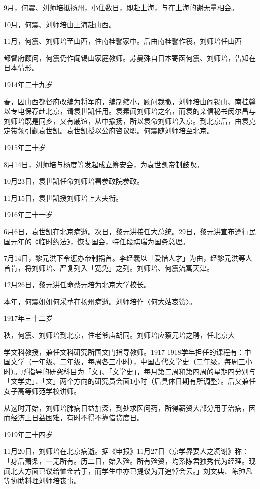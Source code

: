 9月，何震、刘师培抵扬州，小住数日，即赴上海，与在上海的谢无量相会。

10月，何震、刘师培由上海赴山西。

11月，何震、刘师培至山西，住南桂馨家中。后由南桂馨作筏，刘师培任山西


\noindent 都督府顾问，何震仍作阎锡山家庭教师。苏曼殊自日本寄函何震、刘师培，告知在日本情形。

1914年二十九岁

春，因山西都督府改编为将军府，编制缩小，顾问裁撤，刘师培由阎锡山、南桂馨以专电保荐赴北京，请袁世凯任用。袁素闻刘师培之名，而袁的亲信秘书闵尔昌与刘师培既是同乡，又有戚谊，从中揄扬，所以袁命刘师培入京。到北京后，由袁克定带领引觐袁世凯。袁世凯授以公府咨议职。何震随刘师培至北京。

1915年三十岁

8月14日，刘师培与杨度等发起成立筹安会，为袁世凯帝制鼓吹。

10月23日，袁世凯任命刘师培署参政院参政。

11月15日，袁世凯授刘师培上大夫衔。

1916年三十一岁

6月6日，袁世凯在北京病逝。次日，黎元洪接任大总统。29日，黎元洪宣布遵行民国元年的《临时约法》，恢复国会，特任段祺瑞为国务总理。

7月14日，黎元洪下令惩办帝制祸首。李经羲以「爱惜人才」为由，经黎元洪等人首肯，将刘师培、严复列入「宽免」之列。刘师培、何震流寓天津。

12月26日，黎元洪任命蔡元培为北京大学校长。

本年，何震姐姐何采苹在扬州病逝。刘师培作〈何大姑哀赞〉。

1917年三十二岁

秋，何震、刘师培到北京，住老爷庙胡同。刘师培应蔡元培之聘，任北京大


\noindent 学文科教授，兼任文科研究所国文门指导教师。1917-1918学年担任的课程有：中国文学（一年级、二年级，每周各三小时），中国古代文学史（二年级，每周三小时）。所指导的研究科目为「文」、「文学史」，每月第二周和第四周的星期四分别与「文学史」、「文」两个方向的研究员会面1小时（后具体日期有所调整）。后又兼任女子高等师范学校讲师。

从这时开始，刘师培肺病日益加深，到处求医问药，所得薪资大部分用于治病，因而经济上日益困难，有时不得不靠借贷度日。

1919年三十四岁

11月20日，刘师培在北京病逝。据《申报》11月27日〈京学界要人之凋谢》称：「身后萧条，一无所有。历二日，始入殓。所有殓资，均系陈君独秀代为经理。现闻北大方面已议给恤金若于，而学生中亦已提议为开追悼会云。」刘文典、陈钟凡等协助料理刘师培丧事。

